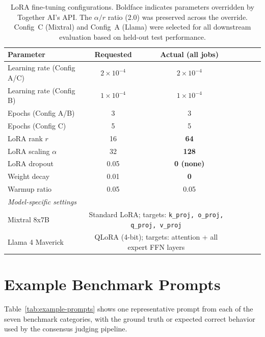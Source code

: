 \begin{table}[ht]
\centering
\small
\begin{tabular}{lcccccc}
\toprule
\textbf{Parameter} & \textbf{Requested} & \textbf{Actual (all jobs)} \\
\midrule
Learning rate (Config A/C) & $2 \times 10^{-4}$ & $2 \times 10^{-4}$ \\
Learning rate (Config B) & $1 \times 10^{-4}$ & $1 \times 10^{-4}$ \\
Epochs (Config A/B) & 3 & 3 \\
Epochs (Config C) & 5 & 5 \\
LoRA rank $r$ & 16 & \textbf{64} \\
LoRA scaling $\alpha$ & 32 & \textbf{128} \\
LoRA dropout & 0.05 & \textbf{0 (none)} \\
Weight decay & 0.01 & \textbf{0} \\
Warmup ratio & 0.05 & 0.05 \\
\midrule
\multicolumn{3}{l}{\textit{Model-specific settings}} \\
\midrule
Mixtral 8x7B & \multicolumn{2}{c}{Standard LoRA; targets: \texttt{k\_proj, o\_proj, q\_proj, v\_proj}} \\
Llama 4 Maverick & \multicolumn{2}{c}{QLoRA (4-bit); targets: attention + all expert FFN layers} \\
\bottomrule
\end{tabular}
\caption{LoRA fine-tuning configurations. Boldface indicates parameters overridden by Together AI's API. The $\alpha/r$ ratio (2.0) was preserved across the override. Config~C (Mixtral) and Config~A (Llama) were selected for all downstream evaluation based on held-out test performance.}
\label{tab:ft-configs}
\end{table}

\section{Example Benchmark Prompts}
\label{app:example-prompts}

Table~\ref{tab:example-prompts} shows one representative prompt from each of the seven benchmark categories, with the ground truth or expected correct behavior used by the consensus judging pipeline.

